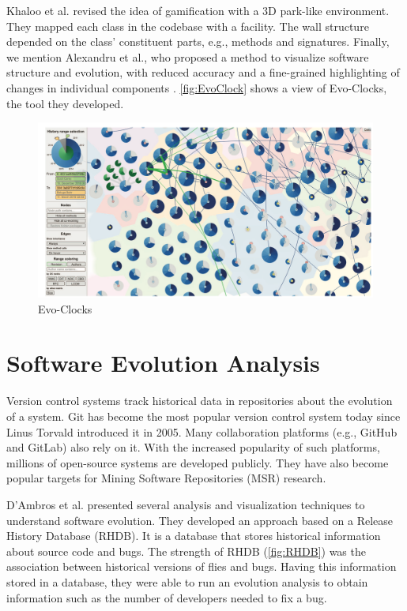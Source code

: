 Khaloo et al. \cite{Khaloo2017} revised the idea of gamification with a 3D park-like environment. They mapped each class in the codebase with a facility. The wall structure depended on the class' constituent parts, e.g., methods and signatures. 
Finally, we mention Alexandru et al., who proposed a method to visualize software structure and evolution, 
with reduced accuracy and a fine-grained highlighting of changes in individual components \cite{Alexandru2019}. \autoref{fig:EvoClock} shows a view of Evo-Clocks, the tool they developed. 

\begin{figure}[ht]
\centering
  \includegraphics[width=0.9\linewidth]{Alexandru_EvoClock.png} 
  \caption{Evo-Clocks}
      \label{fig:EvoClock}

\end{figure}


\section{Software Evolution Analysis}

Version control systems track historical data in repositories about the evolution of a system. Git has become the most popular version control system today since Linus Torvald introduced it in 2005. Many collaboration platforms (e.g., GitHub and GitLab) also rely on it. With the increased popularity of such platforms, millions of open-source systems are developed publicly. They have also become popular targets for Mining Software Repositories (MSR) research.

D'Ambros et al. \cite{SoftwareEvolution} presented several analysis and visualization techniques to understand software evolution. 
They developed an approach based on a Release History Database (RHDB). 
It is a database that stores historical information about source code and bugs. 
The strength of RHDB (\autoref{fig:RHDB}) was the association between historical versions of flies and bugs. 
Having this information stored in a database, they were able to run an evolution analysis to obtain information such as the number of developers needed to fix a bug.   

